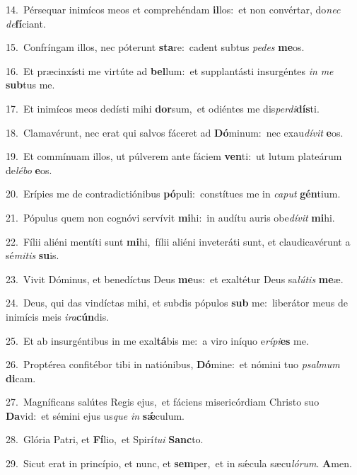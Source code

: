 {\numbfont\textcolor{\numbcolor}{14.}}~Pérsequar inimícos meos et comprehéndam \textbf{il}\-los:~\star et non convértar, do\textit{nec} \textit{de}\-\textbf{fí}ciant.\par
{\numbfont\textcolor{\numbcolor}{15.}}~Confríngam illos, nec póterunt \textbf{sta}\-re:~\star cadent subtus \textit{pe}\-\textit{des} \textbf{me}\-os.\par
{\numbfont\textcolor{\numbcolor}{16.}}~Et præcinxísti me virtúte ad \textbf{bel}\-lum:~\star et supplantásti insurgéntes \textit{in} \textit{me} \textbf{sub}\-tus me.\par
{\numbfont\textcolor{\numbcolor}{17.}}~Et inimícos meos dedísti mihi \textbf{dor}\-sum,~\star et odiéntes me dis\-\textit{per}\-\textit{di}\textbf{dís}ti.\par
{\numbfont\textcolor{\numbcolor}{18.}}~Clamavérunt, nec erat qui salvos fáceret ad \textbf{Dó}\-minum:~\star nec exau\-\textit{dí}\-\textit{vit} \textbf{e}\-os.\par
{\numbfont\textcolor{\numbcolor}{19.}}~Et commínuam illos, ut púlverem ante fáciem \textbf{ven}\-ti:~\star ut lutum plateárum de\-\textit{lé}\-\textit{bo} \textbf{e}\-os.\par
{\numbfont\textcolor{\numbcolor}{20.}}~Erípies me de contradictiónibus \textbf{pó}\-puli:~\star constítues me in \textit{ca}\-\textit{put} \textbf{gén}\-tium.\par
{\numbfont\textcolor{\numbcolor}{21.}}~Pópulus quem non cognóvi servívit \textbf{mi}\-hi:~\star in audítu auris obe\-\textit{dí}\-\textit{vit} \textbf{mi}\-hi.\par
{\numbfont\textcolor{\numbcolor}{22.}}~Fílii aliéni mentíti sunt \textbf{mi}\-hi,~\star fílii aliéni inveteráti sunt, et claudicavérunt a sé\-\textit{mi}\-\textit{tis} \textbf{su}\-is.\par
{\numbfont\textcolor{\numbcolor}{23.}}~Vivit Dóminus, et benedíctus Deus \textbf{me}\-us:~\star et exaltétur Deus sa\-\textit{lú}\-\textit{tis} \textbf{me}\-æ.\par
{\numbfont\textcolor{\numbcolor}{24.}}~Deus, qui das vindíctas mihi, et subdis pópulos \textbf{sub} me:~\star liberátor meus de inimícis meis \textit{i}\-\textit{ra}\textbf{cún}dis.\par
{\numbfont\textcolor{\numbcolor}{25.}}~Et ab insurgéntibus in me exal\-\textbf{tá}\-bis me:~\star a viro iníquo e\-\textit{rí}\-\textit{pi}\textbf{es} me.\par
{\numbfont\textcolor{\numbcolor}{26.}}~Proptérea confitébor tibi in natiónibus, \textbf{Dó}\-mine:~\star et nómini tuo \textit{psal}\-\textit{mum} \textbf{di}\-cam.\par
{\numbfont\textcolor{\numbcolor}{27.}}~Magníficans salútes Regis ejus,~\dagger et fáciens misericórdiam Christo suo \textbf{Da}\-vid:~\star et sémini ejus us\textit{que} \textit{in} \textbf{sǽ}\-culum.\par
{\numbfont\textcolor{\numbcolor}{28.}}~Glória Patri, et \textbf{Fí}\-lio,~\star et Spirí\-\textit{tu}\-\textit{i} \textbf{Sanc}\-to.\par
{\numbfont\textcolor{\numbcolor}{29.}}~Sicut erat in princípio, et nunc, et \textbf{sem}\-per,~\star et in sǽcula sæcu\-\textit{ló}\-\textit{rum}. \textbf{A}\-men.\par
